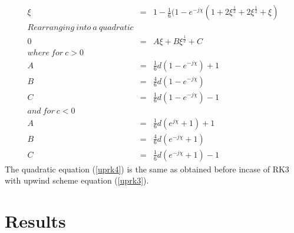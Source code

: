 \documentclass[a4paper,12pt]{report}
\begin{document}
\begin{eqnarray}
\xi &=& 1- \frac{1}{6}(1-e^{-j\chi}(1+2\xi^\frac{1}{2}+2\xi^\frac{1}{2} +\xi)\nonumber \\
Rearranging\ into\ a\ quadratic \nonumber \\
0 &=& A\xi+B\xi^{\frac{1}{2}} + C \label{uprk4}\\
where\ for\ c>0 \nonumber\\
A &=& \frac{1}{6}d(1-e^{-j\chi})+1  \nonumber\\
B &=& \frac{4}{6}d(1-e^{-j\chi}) \nonumber\\
C &=& \frac{1}{6}d(1-e^{-j\chi}) - 1 \nonumber \\
and\ for\ c<0 \nonumber\\
A &=& \frac{1}{6}d(e^{j\chi}+1)+1  \nonumber\\
B &=& \frac{4}{6}d(e^{-j\chi}+1) \nonumber\\
C &=& \frac{1}{6}d(e^{-j\chi}+1) - 1 \nonumber
\end{eqnarray}
The quadratic equation (\ref{uprk4}) is the same as obtained before incase of RK3 with upwind scheme equation (\ref{uprk3}).
\newpage
\chapter{Results}
\end{document}
